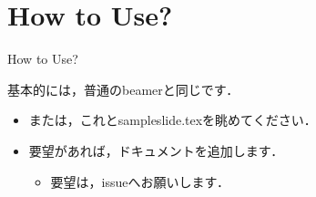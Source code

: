 \documentclass[aspectratio=1610,14pt]{beamer}
\begin{document}
\section{How to Use?}

\begin{frame}
    \tableofcontents[currentsection]
\end{frame}

\begin{frame}{How to Use?}
    \begin{textblock}{基本的には，普通のbeamerと同じです．}
        \begin{itemize}
            \item{または，これとsampleslide.texを眺めてください．}
            \item{要望があれば，ドキュメントを追加します．}
                \begin{itemize}
                    \item{要望は，issueへお願いします．}
                \end{itemize}
        \end{itemize}
    \end{textblock}
\end{frame}
\end{document}
